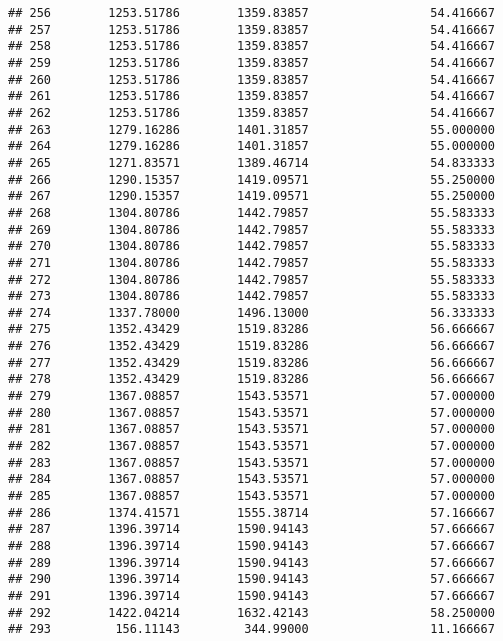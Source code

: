\documentclass[]{article}
\begin{document}
\begin{verbatim}
## 256        1253.51786        1359.83857                 54.416667
## 257        1253.51786        1359.83857                 54.416667
## 258        1253.51786        1359.83857                 54.416667
## 259        1253.51786        1359.83857                 54.416667
## 260        1253.51786        1359.83857                 54.416667
## 261        1253.51786        1359.83857                 54.416667
## 262        1253.51786        1359.83857                 54.416667
## 263        1279.16286        1401.31857                 55.000000
## 264        1279.16286        1401.31857                 55.000000
## 265        1271.83571        1389.46714                 54.833333
## 266        1290.15357        1419.09571                 55.250000
## 267        1290.15357        1419.09571                 55.250000
## 268        1304.80786        1442.79857                 55.583333
## 269        1304.80786        1442.79857                 55.583333
## 270        1304.80786        1442.79857                 55.583333
## 271        1304.80786        1442.79857                 55.583333
## 272        1304.80786        1442.79857                 55.583333
## 273        1304.80786        1442.79857                 55.583333
## 274        1337.78000        1496.13000                 56.333333
## 275        1352.43429        1519.83286                 56.666667
## 276        1352.43429        1519.83286                 56.666667
## 277        1352.43429        1519.83286                 56.666667
## 278        1352.43429        1519.83286                 56.666667
## 279        1367.08857        1543.53571                 57.000000
## 280        1367.08857        1543.53571                 57.000000
## 281        1367.08857        1543.53571                 57.000000
## 282        1367.08857        1543.53571                 57.000000
## 283        1367.08857        1543.53571                 57.000000
## 284        1367.08857        1543.53571                 57.000000
## 285        1367.08857        1543.53571                 57.000000
## 286        1374.41571        1555.38714                 57.166667
## 287        1396.39714        1590.94143                 57.666667
## 288        1396.39714        1590.94143                 57.666667
## 289        1396.39714        1590.94143                 57.666667
## 290        1396.39714        1590.94143                 57.666667
## 291        1396.39714        1590.94143                 57.666667
## 292        1422.04214        1632.42143                 58.250000
## 293         156.11143         344.99000                 11.166667

\end{verbatim}
\end{document}

